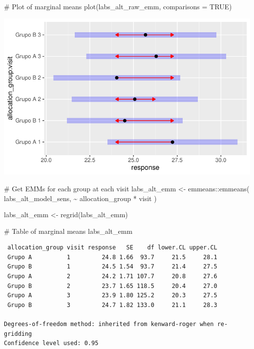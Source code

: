 \documentclass[
  letterpaper,
  DIV=11,
  numbers=noendperiod]{scrartcl}
\newenvironment{Shaded}{\begin{snugshade}}{\end{snugshade}}
\newcommand{\AttributeTok}[1]{\textcolor[rgb]{0.40,0.45,0.13}{#1}}
\newcommand{\CommentTok}[1]{\textcolor[rgb]{0.37,0.37,0.37}{#1}}
\newcommand{\ConstantTok}[1]{\textcolor[rgb]{0.56,0.35,0.01}{#1}}
\newcommand{\FunctionTok}[1]{\textcolor[rgb]{0.28,0.35,0.67}{#1}}
\newcommand{\NormalTok}[1]{\textcolor[rgb]{0.00,0.23,0.31}{#1}}
\newcommand{\OtherTok}[1]{\textcolor[rgb]{0.00,0.23,0.31}{#1}}
\newcommand{\SpecialCharTok}[1]{\textcolor[rgb]{0.37,0.37,0.37}{#1}}
\begin{document}
\begin{Shaded}
\begin{Highlighting}[]
\CommentTok{\# Plot of marginal means}
\FunctionTok{plot}\NormalTok{(labs\_alt\_raw\_emm, }\AttributeTok{comparisons =} \ConstantTok{TRUE}\NormalTok{)}
\end{Highlighting}
\end{Shaded}

\includegraphics{Outcomes_V1V2V3_files/figure-pdf/labs_alt_raw_emm-1.pdf}

\begin{Shaded}
\begin{Highlighting}[]
\CommentTok{\# Get EMMs for each group at each visit}
\NormalTok{labs\_alt\_emm }\OtherTok{\textless{}{-}}\NormalTok{ emmeans}\SpecialCharTok{::}\FunctionTok{emmeans}\NormalTok{(}
\NormalTok{    labs\_alt\_model\_sens, }
    \SpecialCharTok{\textasciitilde{}}\NormalTok{ allocation\_group }\SpecialCharTok{*}\NormalTok{ visit}
\NormalTok{)}

\NormalTok{labs\_alt\_emm }\OtherTok{\textless{}{-}} \FunctionTok{regrid}\NormalTok{(labs\_alt\_emm)}

\CommentTok{\# Table of marginal means}
\NormalTok{labs\_alt\_emm}
\end{Highlighting}
\end{Shaded}

\begin{verbatim}
 allocation_group visit response   SE    df lower.CL upper.CL
 Grupo A          1         24.8 1.66  93.7     21.5     28.1
 Grupo B          1         24.5 1.54  93.7     21.4     27.5
 Grupo A          2         24.2 1.71 107.7     20.8     27.6
 Grupo B          2         23.7 1.65 118.5     20.4     27.0
 Grupo A          3         23.9 1.80 125.2     20.3     27.5
 Grupo B          3         24.7 1.82 133.0     21.1     28.3

Degrees-of-freedom method: inherited from kenward-roger when re-gridding 
Confidence level used: 0.95 
\end{verbatim}
\end{document}
